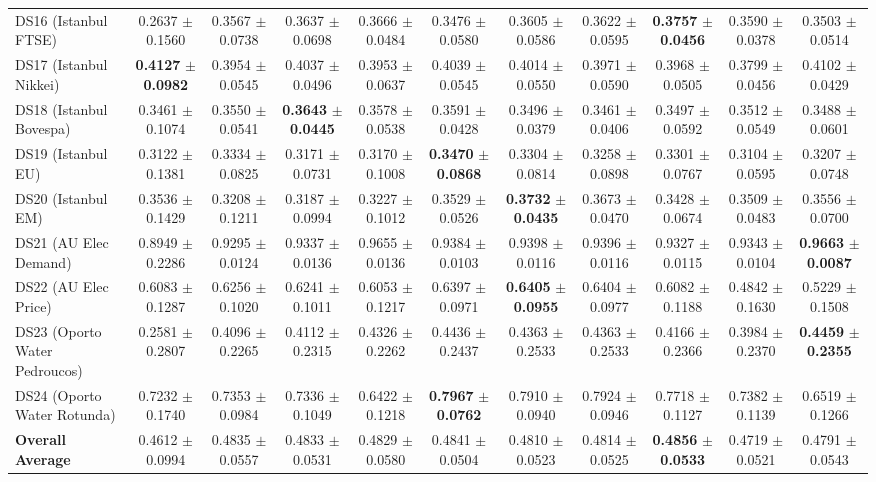 \begin{table}[t]
{{\begin{tabular}{lcccccccccc}
DS16 (Istanbul FTSE) & 0.2637 $\pm$ 0.1560 & 0.3567 $\pm$ 0.0738 & 0.3637 $\pm$ 0.0698 & 0.3666 $\pm$ 0.0484 & 0.3476 $\pm$ 0.0580 & 0.3605 $\pm$ 0.0586 & 0.3622 $\pm$ 0.0595 & \textbf{0.3757} $\pm$ \textbf{0.0456} & 0.3590 $\pm$ 0.0378 & 0.3503 $\pm$ 0.0514 \\
DS17 (Istanbul Nikkei) & \textbf{0.4127} $\pm$ \textbf{0.0982} & 0.3954 $\pm$ 0.0545 & 0.4037 $\pm$ 0.0496 & 0.3953 $\pm$ 0.0637 & 0.4039 $\pm$ 0.0545 & 0.4014 $\pm$ 0.0550 & 0.3971 $\pm$ 0.0590 & 0.3968 $\pm$ 0.0505 & 0.3799 $\pm$ 0.0456 & 0.4102 $\pm$ 0.0429 \\
DS18 (Istanbul Bovespa) & 0.3461 $\pm$ 0.1074 & 0.3550 $\pm$ 0.0541 & \textbf{0.3643} $\pm$ \textbf{0.0445} & 0.3578 $\pm$ 0.0538 & 0.3591 $\pm$ 0.0428 & 0.3496 $\pm$ 0.0379 & 0.3461 $\pm$ 0.0406 & 0.3497 $\pm$ 0.0592 & 0.3512 $\pm$ 0.0549 & 0.3488 $\pm$ 0.0601 \\
DS19 (Istanbul EU) & 0.3122 $\pm$ 0.1381 & 0.3334 $\pm$ 0.0825 & 0.3171 $\pm$ 0.0731 & 0.3170 $\pm$ 0.1008 & \textbf{0.3470} $\pm$ \textbf{0.0868} & 0.3304 $\pm$ 0.0814 & 0.3258 $\pm$ 0.0898 & 0.3301 $\pm$ 0.0767 & 0.3104 $\pm$ 0.0595 & 0.3207 $\pm$ 0.0748 \\
DS20 (Istanbul EM) & 0.3536 $\pm$ 0.1429 & 0.3208 $\pm$ 0.1211 & 0.3187 $\pm$ 0.0994 & 0.3227 $\pm$ 0.1012 & 0.3529 $\pm$ 0.0526 & \textbf{0.3732} $\pm$ \textbf{0.0435} & 0.3673 $\pm$ 0.0470 & 0.3428 $\pm$ 0.0674 & 0.3509 $\pm$ 0.0483 & 0.3556 $\pm$ 0.0700 \\
DS21 (AU Elec Demand) & 0.8949 $\pm$ 0.2286 & 0.9295 $\pm$ 0.0124 & 0.9337 $\pm$ 0.0136 & 0.9655 $\pm$ 0.0136 & 0.9384 $\pm$ 0.0103 & 0.9398 $\pm$ 0.0116 & 0.9396 $\pm$ 0.0116 & 0.9327 $\pm$ 0.0115 & 0.9343 $\pm$ 0.0104 & \textbf{0.9663} $\pm$ \textbf{0.0087} \\
DS22 (AU Elec Price) & 0.6083 $\pm$ 0.1287 & 0.6256 $\pm$ 0.1020 & 0.6241 $\pm$ 0.1011 & 0.6053 $\pm$ 0.1217 & 0.6397 $\pm$ 0.0971 & \textbf{0.6405} $\pm$ \textbf{0.0955} & 0.6404 $\pm$ 0.0977 & 0.6082 $\pm$ 0.1188 & 0.4842 $\pm$ 0.1630 & 0.5229 $\pm$ 0.1508 \\
DS23 (Oporto Water Pedroucos) & 0.2581 $\pm$ 0.2807 & 0.4096 $\pm$ 0.2265 & 0.4112 $\pm$ 0.2315 & 0.4326 $\pm$ 0.2262 & 0.4436 $\pm$ 0.2437 & 0.4363 $\pm$ 0.2533 & 0.4363 $\pm$ 0.2533 & 0.4166 $\pm$ 0.2366 & 0.3984 $\pm$ 0.2370 & \textbf{0.4459} $\pm$ \textbf{0.2355} \\
DS24 (Oporto Water Rotunda) & 0.7232 $\pm$ 0.1740 & 0.7353 $\pm$ 0.0984 & 0.7336 $\pm$ 0.1049 & 0.6422 $\pm$ 0.1218 & \textbf{0.7967} $\pm$ \textbf{0.0762} & 0.7910 $\pm$ 0.0940 & 0.7924 $\pm$ 0.0946 & 0.7718 $\pm$ 0.1127 & 0.7382 $\pm$ 0.1139 & 0.6519 $\pm$ 0.1266 \\
\midrule
\textbf{Overall Average} & 0.4612 $\pm$ 0.0994 & 0.4835 $\pm$ 0.0557 & 0.4833 $\pm$ 0.0531 & 0.4829 $\pm$ 0.0580 & 0.4841 $\pm$ 0.0504 & 0.4810 $\pm$ 0.0523 & 0.4814 $\pm$ 0.0525 & \textbf{0.4856} $\pm$ \textbf{0.0533} & 0.4719 $\pm$ 0.0521 & 0.4791 $\pm$ 0.0543 \\
\bottomrule
\end{tabular}%
}%
}
\end{table}
